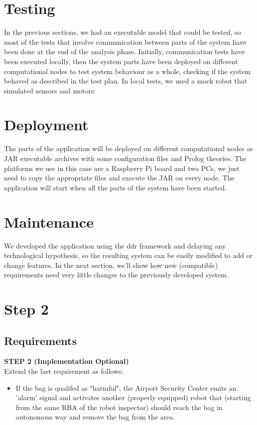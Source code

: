 \documentclass{llncs}
\newcommand{\labelsec}[1]{\label{sec:#1}}
\begin{document}
\section{Testing}
\labelsec{testing}
In the previous sections, we had an executable model that could be tested, so most of the tests that involve communication between parts of the system have been done at the end of the analysis phase. Initially, communication tests have been executed locally, then the system parts have been deployed on different computational nodes to test system behaviour as a whole, checking if the system behaved as described in the test plan.
In local tests, we used a mock robot that simulated sensors and motors:

\section{Deployment}
\labelsec{Deployment}
The parts of the application will be deployed on different computational nodes as JAR executable archives with some configuration files and Prolog theories.
The platforms we use in this case are a Raspberry Pi board and two PCs, we just need to copy the appropriate files and execute the JAR on every node. The application will start when all the parts of the system have been started.
\section{Maintenance}
\labelsec{Maintenance}
We developed the application using the ddr framework and delaying any technological hypothesis, so the resulting system can be easily modified to add or change features. In the next section, we'll show how new (compatible) requirements need very little changes to the previously developed system.
\section{Step 2}
\subsection{Requirements}
\textbf{STEP 2 (Implementation Optional)}\\
Extend the last requirement as follows:
\begin{itemize}
\item If the bag is qualifed as "harmful", the Airport Security Center emits an 'alarm' signal and activates another (properly equipped) robot that (starting from the same RBA of the robot inspector) should reach the bag in autonomous way and remove the bag from the area.
\end{itemize}
\end{document}
